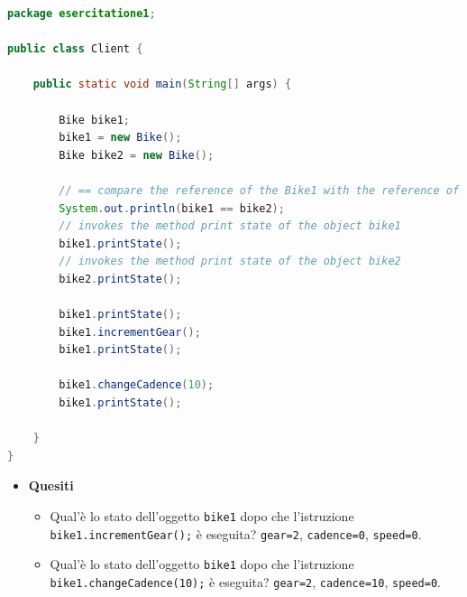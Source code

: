 \documentclass{article}
\theoremstyle{definition}
\begin{document}
\begin{lstlisting}[language=Java,escapechar=|]
package esercitatione1;

public class Client {

	public static void main(String[] args) {

		Bike bike1;
		bike1 = new Bike();
		Bike bike2 = new Bike();

		// == compare the reference of the Bike1 with the reference of the Bike2
		System.out.println(bike1 == bike2);
		// invokes the method print state of the object bike1
		bike1.printState();
		// invokes the method print state of the object bike2
		bike2.printState();

		bike1.printState();
		bike1.incrementGear();
		bike1.printState();
		
		bike1.changeCadence(10);
		bike1.printState();
		
	}
}
\end{lstlisting}

\begin{itemize}
\item \textbf{Quesiti}
\begin{itemize}
\item Qual'\`e lo stato dell'oggetto \texttt{bike1} dopo che l'istruzione \texttt{bike1.incrementGear();} \`e eseguita? 
\texttt{gear=2}, \texttt{cadence=0}, \texttt{speed=0}.
\item Qual'\`e lo stato dell'oggetto  \texttt{bike1} dopo che l'istruzione \texttt{bike1.changeCadence(10);} \`e eseguita? 
\texttt{gear=2}, \texttt{cadence=10}, \texttt{speed=0}.
\end{itemize}
\end{itemize}
\end{document}
